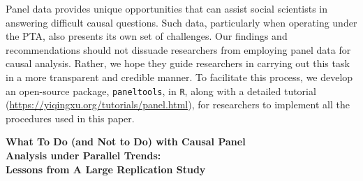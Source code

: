 \documentclass[12pt]{article}
\begin{document}
Panel data provides unique opportunities that can assist social scientists in answering difficult causal questions. Such data, particularly when operating under the PTA, also presents its own set of challenges. Our findings and recommendations should not dissuade researchers from employing panel data for causal analysis. Rather, we hope they guide researchers in carrying out this task in a more transparent and credible manner. To facilitate this process, we develop an open-source package, \texttt{paneltools}, in \texttt{R}, along with a detailed tutorial  (\url{https://yiqingxu.org/tutorials/panel.html}), for researchers to implement all the procedures used in this paper.


\clearpage
\FloatBarrier
\bigskip
\onehalfspacing


\clearpage




\begin{center}
\large\bf What To Do (and Not to Do) with Causal Panel\\Analysis under  
Parallel Trends:\\Lessons from A Large Replication Study\\
\end{center}

\appendix
\onehalfspacing
\setcounter{page}{1}
\setcounter{table}{0}
\setcounter{figure}{0}
\setcounter{equation}{0}
\setcounter{footnote}{0}
\renewcommand\thetable{A\arabic{table}}
\renewcommand\thefigure{A\arabic{figure}}
\renewcommand{\thepage}{A-\arabic{page}}
\renewcommand{\theequation}{A\arabic{equation}}
\renewcommand{\thefootnote}{A\arabic{footnote}}
\end{document}
